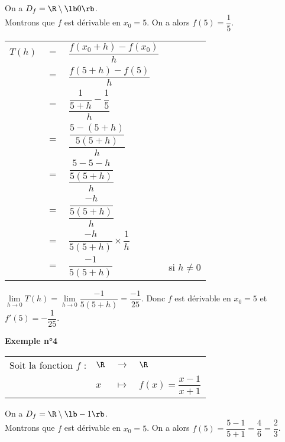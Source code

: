 On a $D_f = \R \setminus \lb 0 \rb$. \\

Montrons que $f$ est dérivable en $x_0 = 5$. On a alors $f(5) = \dfrac{1}{5}$. \\

\begin{tabular}{llll}
$T(h)$ & $=$ & $\dfrac{f(x_0 + h) - f(x_0)}{h}$ & \vspace*{.3cm} \\
& $=$ & $\dfrac{f(5 + h) - f(5)}{h}$ & \vspace*{.3cm} \\
& $=$ & $\dfrac{ \dfrac{1}{5+h} - \dfrac{1}{5}}{h}$ & \vspace*{.3cm} \\
& $=$ & $\dfrac{\dfrac{5-(5+h)}{5(5+h)}}{h}$ & \vspace*{.3cm} \\
& $=$ & $\dfrac{\dfrac{5-5-h}{5(5+h)}}{h}$ & \vspace*{.3cm} \\
& $=$ & $\dfrac{\dfrac{-h}{5(5+h)}}{h}$ & \vspace*{.3cm} \\
& $=$ & $\dfrac{-h}{5(5+h)} \times \dfrac{1}{h}$ & \vspace*{.3cm} \\
& $=$ & $\dfrac{-1}{5\left(5+h\right)}$ & si $h \neq 0$ \\
\end{tabular}

\vspace*{.3cm}

$\lim\limits_{h \to 0} T(h) = \lim\limits_{h \to 0} \dfrac{-1}{5\left(5+h\right)} = \dfrac{-1}{25}$. Donc $f$ est dérivable en $x_0 = 5$ et $f'(5) = -\dfrac{1}{25}$. \\

\newpage

\textbf{Exemple n°4} \\

\begin{tabular}{llll}
Soit la fonction $f$ : & $\R$ & $\longrightarrow$ & $\R$ \\
& $x$ & $\longmapsto$ & $f\left(x\right) = \dfrac{x-1}{x+1}$ \\
\end{tabular}

On a $D_f = \R \setminus \lb -1 \rb$. \\

Montrons que $f$ est dérivable en $x_0 = 5$. On a alors $f(5) = \dfrac{5-1}{5+1} = \dfrac{4}{6} = \dfrac{2}{3}$. \\

